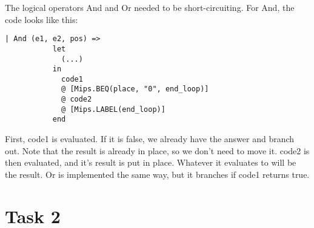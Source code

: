 \documentclass[10pt]{article}
\begin{document}
The logical operators And and Or needed to be short-circuiting. For And, the code looks like this:

\begin{Verbatim}[frame=single]
       | And (e1, e2, pos) =>
           let
             (...)
           in
             code1
             @ [Mips.BEQ(place, "0", end_loop)]
             @ code2
             @ [Mips.LABEL(end_loop)]
           end
\end{Verbatim}
First, code1 is evaluated. If it is false, we already have the answer and branch out. Note that the result is already in place, so we don't need to move it. code2 is then evaluated, and it's result is put in place. Whatever it evaluates to will be the result. Or is implemented the same way, but it branches if code1 returns true.

\section{Task 2}
\end{document}
